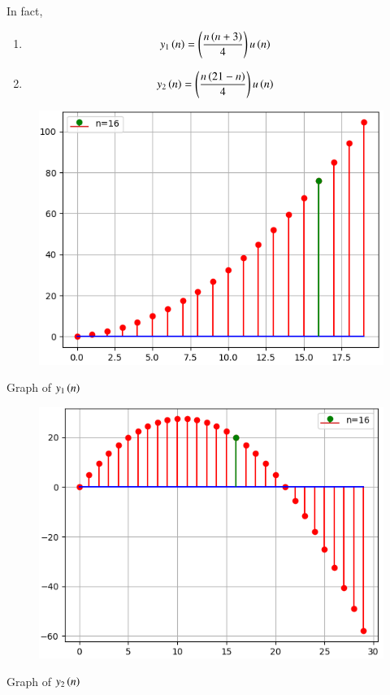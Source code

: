\documentclass[beamer]{IEEEtran}
\theoremstyle{remark}
\begin{document}
In fact,\\
    \begin{enumerate}
    \item
    \begin{align}
        y_1\left(n\right)&=\left(\frac{n\left(n+3\right)}{4}\right)u\left(n\right)
    \end{align}
    \item
    \begin{align}
        y_2\left(n\right)&=\left(\frac{n\left(21-n\right)}{4}\right)u\left(n\right)
    \end{align}
\end{enumerate}
\begin{figure}[h]
    \centering
    \includegraphics[scale=0.60]{figs/py_4.png}
    \label{fig:s1n}
\end{figure}
\begin{center}
    Graph of $y_1\left(n\right)$\\[30ex]
\end{center}
\begin{figure}[h]
    \centering
    \includegraphics[scale=0.60]{figs/py_6.png}
    \label{s2n}
\end{figure}
\begin{center}
Graph of $y_2\left(n\right)$
\end{center}
\end{document}
